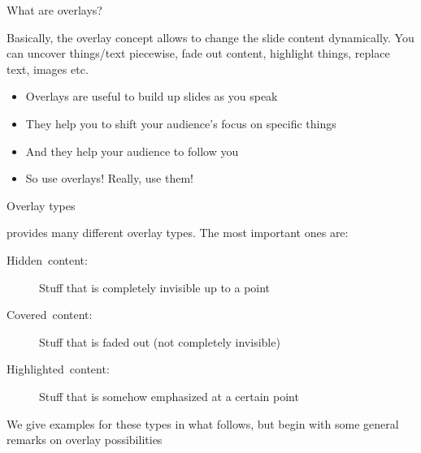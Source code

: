 \documentclass[english]{beamer}
\begin{document}
\begin{frame}{What are overlays?}

Basically, the overlay concept allows to change the slide content
dynamically. You can uncover things/text piecewise, fade out content,
highlight things, replace text, images etc.

\pause{}
\begin{itemize}[<+->]
\item Overlays are useful to build up slides as you speak
\item They help you to shift your audience's focus on specific things
\item And they help your audience to follow you
\item So use overlays! \alert<6>{Really, use them!}
\end{itemize}
\end{frame}
%
\begin{frame}{Overlay types}

 provides many different overlay types. The most
important ones are:
\begin{description}
\item [{Hidden~content:}] Stuff that is completely invisible up to a point
\item [{Covered~content:}] Stuff that is faded out (not completely invisible)
\item [{Highlighted~content:}] Stuff that is somehow emphasized at a certain
point
\end{description}
We give examples for these types in what follows, but begin with some
general remarks on overlay possibilities
\end{frame}
\end{document}
